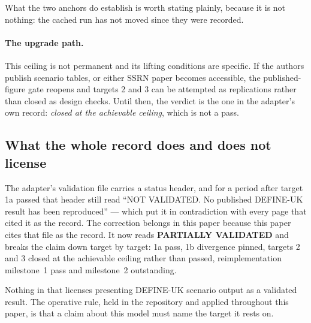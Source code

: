 What the two anchors do establish is worth stating plainly, because it is not nothing: the cached run has not moved since they were recorded.

\paragraph{The upgrade path.} This ceiling is not permanent and its lifting conditions are specific. If the authors publish scenario tables, or either SSRN paper becomes accessible, the published-figure gate reopens and targets 2 and 3 can be attempted as replications rather than closed as design checks. Until then, the verdict is the one in the adapter's own record: \emph{closed at the achievable ceiling}, which is not a pass.

\subsection{What the whole record does and does not license}

The adapter's validation file carries a status header, and for a period after target 1a passed that header still read ``NOT VALIDATED. No published DEFINE-UK result has been reproduced'' --- which put it in contradiction with every page that cited it as the record. The correction belongs in this paper because this paper cites that file as the record. It now reads \textbf{PARTIALLY VALIDATED} and breaks the claim down target by target: 1a pass, 1b divergence pinned, targets 2 and 3 closed at the achievable ceiling rather than passed, reimplementation milestone~1 pass and milestone~2 outstanding.

Nothing in that licenses presenting DEFINE-UK scenario output as a validated result. The operative rule, held in the repository and applied throughout this paper, is that a claim about this model must name the target it rests on.
